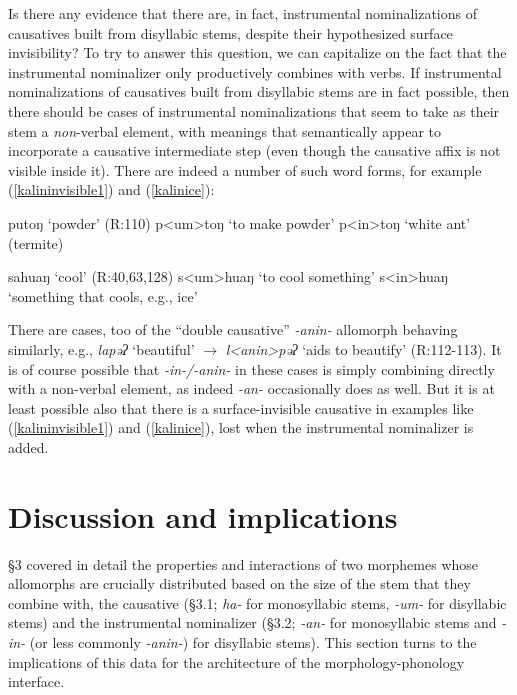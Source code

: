 \documentclass[output=paper,colorlinks,citecolor=brown,
]{langscibook}
\begin{document}
Is there any evidence that there are, in fact, instrumental nominalizations of causatives built from disyllabic stems, despite their hypothesized surface invisibility? To try to answer this question, we can capitalize on the fact that the instrumental nominalizer only productively combines with verbs. If instrumental nominalizations of causatives built from disyllabic stems are in fact possible, then there should be cases of instrumental nominalizations that seem to take as their stem a {\it non}-verbal element, with meanings that semantically appear to incorporate a causative intermediate step (even though the causative affix is not visible inside it). There are indeed a number of such word forms, for example (\ref{kalininvisible1}) and (\ref{kalinice}):

\ea
\ea putoŋ `powder' \hfill (R:110)
\ex p<um>toŋ `to make powder'
\ex p<in>toŋ `white ant' (termite)\label{kalininvisible1}
\z
\z

\ea \ea sahuaŋ `cool' \hfill (R:40,63,128)
\ex s<um>huaŋ `to cool something' 
\ex s<in>huaŋ `something that cools, e.g., ice'\label{kalinice}
\z
\z

\noindent There are cases, too of the ``double causative'' \textit{-anin-} allomorph behaving similarly, e.g., \textit{lapəʔ} `beautiful' $\rightarrow$ \textit{l<anin>pəʔ} `aids to beautify' (R:112-113). It is of course possible that \textit{-in-/-anin-} in these cases is simply combining directly with a non-verbal element, as indeed \textit{-an-} occasionally does as well. But it is at least possible also that there is a surface-invisible causative in examples like (\ref{kalininvisible1}) and (\ref{kalinice}), lost when the instrumental nominalizer is added. 

\section{Discussion and implications}

\S3 covered in detail the properties and interactions of two morphemes whose allomorphs are crucially distributed based on the size of the stem that they combine with, the causative (\S3.1; \textit{ha-} for monosyllabic stems, \textit{-um-} for disyllabic stems) and the instrumental nominalizer (\S3.2; \textit{-an-} for monosyllabic stems and \textit{-in-} (or less commonly \textit{-anin-}) for disyllabic stems). This section turns to the implications of this data for the architecture of the morphology-phonology interface. 
\end{document}
